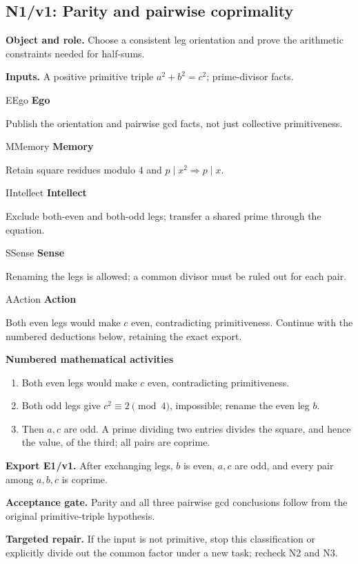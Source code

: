 \documentclass[preprint,12pt,aps,pra,showkeys,amsmath,amssymb,superscriptaddress,floatfix]{revtex4-2}
\theoremstyle{definition}
\theoremstyle{remark}
\newcommand{\mmfaculty}[3]{%
 \begin{mmfacultybox}{#1}{#2}
 {\sffamily\bfseries\color{MMBlue}#2}\par\smallskip #3
 \end{mmfacultybox}}
\newcommand{\field}[2]{\par\smallskip\noindent\textbf{#1.} #2\par}
\begin{document}
\subsection{N1/v1: Parity and pairwise coprimality}

\field{Object and role}{Choose a consistent leg orientation and prove the arithmetic constraints
needed for half-sums.}

\field{Inputs}{A positive primitive triple \(a^2+b^2=c^2\); prime-divisor facts.}

\mmfaculty{E}{Ego}{Publish the orientation and pairwise gcd facts, not just collective
primitiveness.}

\mmfaculty{M}{Memory}{Retain square residues modulo \(4\) and
\(p\mid x^2\Rightarrow p\mid x\).}

\mmfaculty{I}{Intellect}{Exclude both-even and both-odd legs; transfer a shared prime through the
equation.}

\mmfaculty{S}{Sense}{Renaming the legs is allowed; a common divisor must be ruled out for
each pair.}

\mmfaculty{A}{Action}{Both even legs would make \(c\) even, contradicting primitiveness.
Continue with the numbered deductions below, retaining the exact export.}

\smallskip\noindent\textbf{Numbered mathematical activities}

\begin{enumerate}[label=N1.\arabic*,leftmargin=3.4em]

\item Both even legs would make \(c\) even, contradicting primitiveness.

\item Both odd legs give \(c^2\equiv2\pmod4\), impossible; rename the even leg
\(b\).

\item Then \(a,c\) are odd. A prime dividing two entries divides the square,
and hence the value, of the third; all pairs are coprime.

\end{enumerate}

\field{Export E1/v1}{After exchanging legs, \(b\) is even, \(a,c\) are odd, and every pair
among \(a,b,c\) is coprime.}

\field{Acceptance gate}{Parity and all three pairwise gcd conclusions follow from the original
primitive-triple hypothesis.}

\field{Targeted repair}{If the input is not primitive, stop this classification or explicitly
divide out the common factor under a new task; recheck N2 and N3.}
\end{document}
